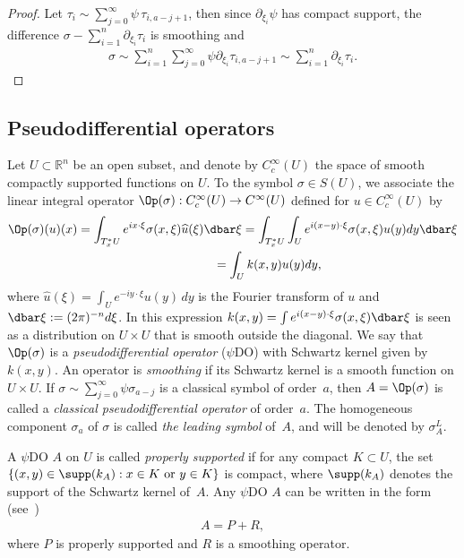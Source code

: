 \begin{proof}
Let $\tau_i\sim\sum\limits_{j=0}^\infty\psi\,\tau_{i,a-j+1}$, then since $\partial_{\xi_i}\psi$ has compact support, the dif\/ference $\sigma-\sum\limits_{i=1}^n\partial_{\xi_i}\tau_i$ is smoothing and
\begin{gather*}
\sigma\sim\sum_{i=1}^n\sum_{j=0}^\infty\psi \partial_{\xi_i}\tau_{i,a-j+1}\sim\sum_{i=1}^n\partial_{\xi_i}\tau_i. \tag*{\qed}
\end{gather*}
\renewcommand{\qed}{}
\end{proof}

\subsection{Pseudodif\/ferential operators}

Let $U\subset \mathbb{R}^n$ be an open subset, and denote by $C^{\infty}_c (U)$ the space of smooth compactly supported functions on $U$. To the symbol $\sigma\in S(U)$, we associate the linear integral operator $\Op(\sigma):C^{\infty}_c (U)\to C^{\infty}(U)$ def\/ined for $u\in C^{\infty}_c (U)$ by
\begin{gather*}
\Op(\sigma)(u)(x) =\int_{T_x^*U}{e^{ix\cdot\xi}\sigma(x, \xi)\widehat u(\xi)\dbar\xi}
 =\int_{T_x^*U}{\int_{U}{e^{i(x-y)\cdot\xi}\sigma(x,\xi) u(y) dy\dbar\xi}}\\
\hphantom{\Op(\sigma)(u)(x)}{} =\int_{U}k(x,y)u(y)dy,
\end{gather*}
where $\widehat u(\xi)=\int_{U}{e^{-iy\cdot\xi}u(y)\,dy}$ is the Fourier transform of $u$ and $\dbar\xi:=(2\pi)^{-n}d\xi$.
In this expression $k(x,y)=\int{e^{i(x-y)\cdot\xi}\sigma(x, \xi)\dbar\xi}$ is seen as a distribution on $U\times U$ that is smooth outside the diagonal. We say that $\Op(\sigma)$ is a {\it pseudodifferential operator} ($\psi$DO) with Schwartz kernel given by $k(x,y)$. An operator is \emph{smoothing} if its Schwartz kernel is a smooth function on $U\times U$. If $\sigma\sim \sum\limits_{j=0}^{\infty}\psi\sigma_{a-j}$ is a classical symbol of order~$a$, then $A=\Op(\sigma)$ is called a {\it classical pseudodifferential operator} of order~$a$. The homogeneous component $\sigma_a$ of $\sigma$ is called {\it the leading symbol} of~$A$, and will be denoted by $\sigma^L_A$.

A $\psi$DO $A$ on $U$ is called {\it properly supported} if for any compact $K\subset U$, the set $\{(x,y)\in \supp(k_A): x\in K  \ {\rm or}\ y\in K\}$ is compact, where $\supp(k_A)$ denotes the support of the Schwartz kernel of~$A$.  Any $\psi$DO $A$ can be written in the form (see~\cite{Shubin})
\begin{gather}
A=P+R, \label{eq:PDO}
\end{gather}
where $P$ is properly supported and $R$ is a smoothing operator.

